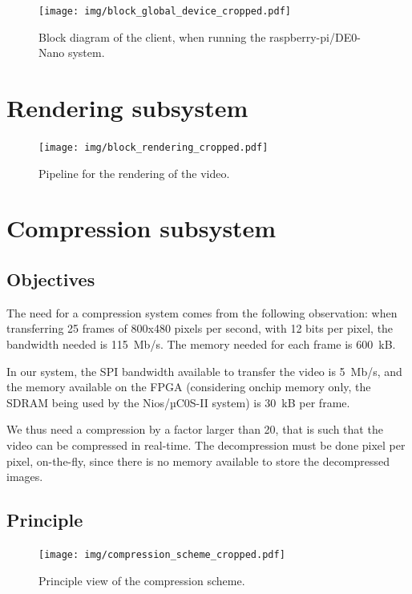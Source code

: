 \documentclass[english, DIV=13]{scrartcl}
\begin{document}
\begin{figure}
    \centering
    \texttt{[image: img/block\_global\_device\_cropped.pdf]}
    \caption{Block diagram of the client, when running the raspberry-pi/DE0-Nano system.}
    \label{fig:global-device}
\end{figure}

\section{Rendering subsystem}
\label{sec:rendering}

\begin{figure}
    \centering
    \texttt{[image: img/block\_rendering\_cropped.pdf]}
    \caption{Pipeline for the rendering of the video.}
\end{figure}

\section{Compression subsystem}
\label{sec:compression}

\subsection{Objectives}

The need for a compression system comes from the following observation:
when transferring 25 frames of 800x480 pixels per second, with 12 bits per pixel,
the bandwidth needed is \SI{115}{Mb/s}. The memory needed for each frame
is \SI{600}{kB}.

In our system, the SPI bandwidth available to transfer the video is \SI{5}{Mb/s},
and the memory available on the FPGA (considering onchip memory only, the SDRAM
being used by the Nios/µC0S-II system) is \SI{30}{kB} per frame.

We thus need a compression by a factor larger than 20, that is such that
the video can be compressed in real-time. The decompression must be done
pixel per pixel, on-the-fly, since there is no memory available to store the
decompressed images.

\subsection{Principle}

\begin{figure}
    \centering
    \texttt{[image: img/compression\_scheme\_cropped.pdf]}
    \caption{Principle view of the compression scheme.}
    \label{fig:compression}
\end{figure}
\end{document}

